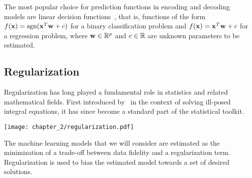 The most popular choice for prediction functions in encoding and decoding models are linear decision functions~\citep{cox2003,laconte2005support, Sutao2011, thirion2006, Naselaris2011}, that is, functions of the form $f(\mathbf{x}) = \text{sgn}(\mathbf{x}^T \mathbf{w} + c)$ for a binary classification problem and $f(\mathbf{x}) = \mathbf{x}^T \mathbf{w} + c$ for a regression problem, where $\mathbf{w} \in {\mathbb R}^p$ and $c \in {\mathbb R}$ are unknown parameters to be estimated. 







\subsection{Regularization}\label{subsec:regularization}

Regularization has long played a fundamental role in statistics and related mathematical fields. First introduced by~\citet{tikhonov1977solutions} in the context of solving ill-posed integral equations, it has since become a standard part of the statistical toolkit. 


\begin{marginfigure}
\vspace{10pt}\hspace{-10pt}\texttt{[image: chapter\_2/regularization.pdf]}
\caption{ The machine learning models that we will consider are estimated as the minimization of a \colorbox{color2}{trade-off} between \colorbox{color1}{data fidelity} and a \colorbox{color3}{regularization} term. Regularization is used to bias the estimated model towards a set of desired solutions.}\label{fig:regularization_formula}
\end{marginfigure}


